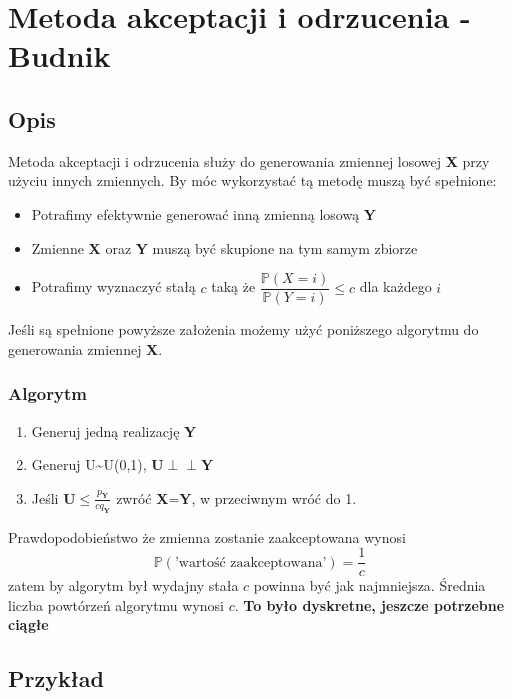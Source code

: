 \documentclass[12pt]{mwrep}
\newcommand{\indep}{\perp \!\!\! \perp}
\begin{document}

	
	\section{Metoda akceptacji i odrzucenia\textsuperscript{\cite{A-O}} - Budnik}
	\subsection{Opis}
	Metoda akceptacji i odrzucenia służy do generowania zmiennej losowej \textbf{X} przy użyciu innych zmiennych. By móc wykorzystać tą metodę muszą być spełnione:
	\begin{itemize}[leftmargin=10mm]
		\item Potrafimy efektywnie generować inną zmienną losową \textbf{Y}
		\item Zmienne \textbf{X} oraz \textbf{Y} muszą być skupione na tym samym zbiorze
		\item Potrafimy wyznaczyć stałą $c$ taką że $\dfrac{\mathbb{P}(X=i)}{\mathbb{P}(Y=i)}\leqslant c$ dla każdego $i$
	\end{itemize}
	Jeśli są spełnione powyższe założenia możemy użyć poniższego algorytmu do generowania zmiennej \textbf{X}.
	\subsubsection{Algorytm}
	\begin{enumerate}[leftmargin=10mm]
		\item Generuj jedną realizację \textbf{Y}
		\item Generuj U\textasciitilde U(0,1), $\textbf{U}\boldsymbol{\indep} \textbf{Y}$
		\item Jeśli $\textbf{U}\leqslant\frac{p_\textbf{Y}}{cq_\textbf{Y}}$ zwróć \textbf{X}=\textbf{Y}, w przeciwnym wróć do 1.
	\end{enumerate}
	Prawdopodobieństwo że zmienna zostanie zaakceptowana wynosi
	$$\mathbb{P}(\text{'wartość zaakceptowana'})=\frac{1}{c}$$
	zatem by algorytm był wydajny stała $c$ powinna być jak najmniejsza. Średnia liczba powtórzeń algorytmu wynosi $c$.
	\textbf{To było dyskretne, jeszcze potrzebne ciągłe}
	
	\subsection{Przykład}


	
\end{document}

